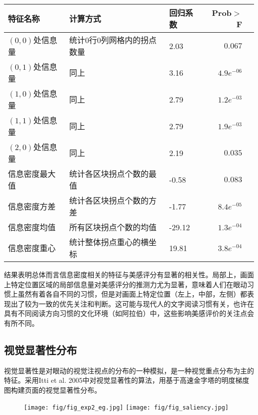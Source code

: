\begin{table}[H]
  \centering
  \small
  \begin{tabular}{lllrr}
    \hline
     特征名称 & 计算方式 & 回归系数 & Prob$>$F \\
    \hline
    $(0, 0)$处信息量 & 统计0行0列网格内的拐点数量 & 2.03 & $0.067$\\
    $(0, 1)$处信息量 & 同上 & 3.16 & $4.9e^{-06}$\\
    $(1, 0)$处信息量 & 同上 & 2.79 & $1.2e^{-03}$\\
    $(1, 1)$处信息量 & 同上 & 2.79 & $1.9e^{-03}$\\
    $(2, 0)$处信息量 & 同上 & 2.19 & $0.035$\\
    信息密度最大值 & 统计各区块拐点个数的最值 & -0.58 & $0.083$\\
    信息密度方差 & 统计各区块拐点个数的方差 & -1.77 & $8.4e^{-05}$\\
    信息密度均值 & 所有区块拐点个数的均值 & -29.12 & $1.3e^{-04}$\\
    信息密度重心 & 统计整体拐点重心的横坐标 & 19.81 & $3.8e^{-04}$\\
    \hline
  \end{tabular}
\end{table}

结果表明总体而言信息密度相关的特征与美感评分有显著的相关性。局部上，画面上特定位置区域的局部信息量对美感评分的推测力尤为显著，意味着人们在眼动习惯上虽然有着各自不同的习惯，但是对画面上特定位置（左上，中部，左侧）都表现出了较为一致的优先关注和判断。这可能与现代人的文字阅读习惯有关，也许在具有不同阅读方向习惯的文化环境（如阿拉伯）中，这些影响美感评价的关注点会有所不同。

\subsection{视觉显著性分布}
视觉显著性是对眼动的视觉注视点的分布的一种模拟，是一种视觉重点分布为主的特征。采用Itti et al. 2005中对视觉显著性的算法\cite{Itti2005}，用基于高速金字塔的明度梯度图构建页面的视觉显著性分布。

\begin{figure}[H]
  \texttt{[image: fig/fig\_exp2\_eg.jpg]}
  \texttt{[image: fig/fig\_saliency.jpg]}
\end{figure}

